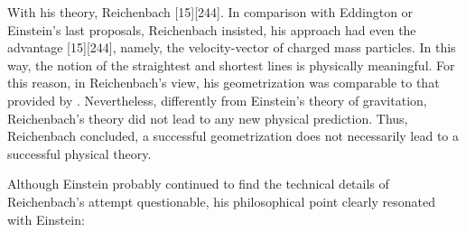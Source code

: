 \documentclass[final]{article}
\begin{document}
With his theory, Reichenbach  [15][244]. In comparison with Eddington or Einstein's last proposals, Reichenbach insisted, his approach had even the advantage  [15][244], namely, the velocity-vector of charged mass particles. In this way, the notion of the straightest and shortest lines is physically meaningful. For this reason, in Reichenbach's view, his geometrization was comparable to that provided by \gr. Nevertheless, differently from Einstein's theory of gravitation, Reichenbach's theory did not lead to any new physical prediction. Thus, Reichenbach concluded, a successful geometrization does not necessarily lead to a successful physical theory. 

Although Einstein probably continued to find the technical details of Reichenbach's attempt questionable, his philosophical point clearly resonated with Einstein:
\end{document}
